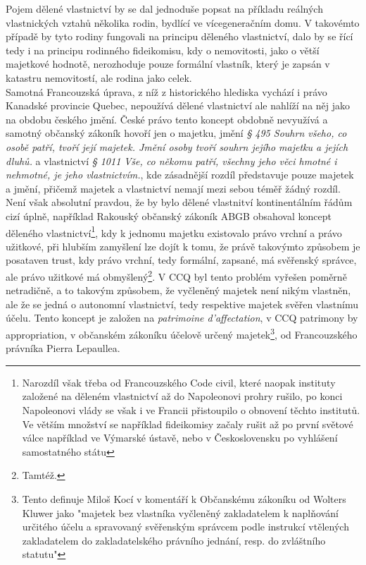 \documentclass{article}
\begin{document}
Pojem dělené vlastnictví by se dal jednoduše popsat na příkladu reálných vlastnických vztahů několika rodin, bydlící ve vícegeneračním domu. V takovémto případě by tyto rodiny fungovali na principu děleného vlastnictví, dalo by se řící tedy i na principu rodinného fideikomisu, kdy o nemovitosti, jako o větší majetkové hodnotě, nerozhoduje pouze formální vlastník, který je zapsán v katastru nemovitostí, ale rodina jako celek.\\

Samotná Francouzská úprava, z níž z historického hlediska vychází i právo Kanadské provincie Quebec, nepoužívá dělené vlastnictví ale nahlíží na něj jako na obdobu českého jmění. České právo tento koncept obdobně nevyužívá a samotný občanský zákoník hovoří jen o majetku, jmění \textit{§ 495 Souhrn všeho, co osobě patří, tvoří její majetek. Jmění osoby tvoří souhrn jejího majetku a jejích dluhů.} a vlastnictví \textit{§ 1011 Vše, co někomu patří, všechny jeho věci hmotné i nehmotné, je jeho vlastnictvím.}, kde zásadnější rozdíl představuje pouze majetek a jmění, přičemž majetek a vlastnictví nemají mezi sebou téměř žádný rozdíl.\\

Není však absolutní pravdou, že by bylo dělené vlastnitví kontinentálním řádům cizí úplně, například Rakouský občanský zákoník ABGB obsahoval koncept děleného vlastnictví\footnote{Narozdíl však třeba od Francouzského Code civil, které naopak instituty založené na děleném vlastnictví až do Napoleonovi prohry rušilo, po konci Napoleonovi vlády se však i ve Francii přistoupilo o obnovení těchto institutů. Ve větším množství se například fideikomisy začaly rušit až po první světové válce například ve Výmarské ústavě, nebo v Československu po vyhlášení samostatného státu}, kdy k jednomu majetku existovalo právo vrchní a právo užitkové, při hlubším zamyšlení lze dojít k tomu, že právě takovýmto způsobem je posataven trust, kdy právo vrchní, tedy formální, zapsané, má svěřenský správce, ale právo užitkové má obmyšlený\footnote{Tamtéž.}. V CCQ byl tento problém vyřešen poměrně netradičně, a to takovým způsobem, že vyčleněný majetek není nikým vlastněn, ale že se jedná o autonomní vlastnictví, tedy respektive majetek svěřen vlastnímu účelu. Tento koncept je založen na \textit{patrimoine d'affectation}, v CCQ patrimony by appropriation, v občanském zákoníku účelově určený majetek\footnote{Tento definuje Miloš Kocí v komentáří k Občanskému zákoníku od Wolters Kluwer jako "majetek bez vlastníka vyčleněný zakladatelem k naplňování určitého účelu a spravovaný svěřenským správcem podle instrukcí vtělených zakladatelem do zakladatelského právního jednání, resp. do zvláštního statutu"}, od Francouzského právníka Pierra Lepaullea.\\ 
\end{document}
